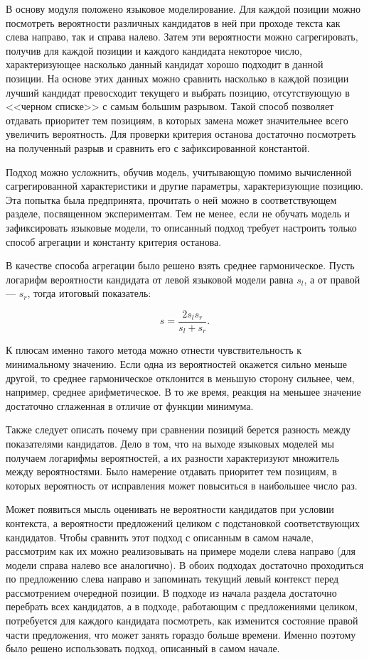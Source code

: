 В основу модуля положено языковое моделирование. Для каждой позиции можно посмотреть вероятности различных кандидатов в ней при проходе текста как слева направо, так и справа налево. Затем эти вероятности можно сагрегировать, получив для каждой позиции и каждого кандидата некоторое число, характеризующее насколько данный кандидат хорошо подходит в данной позиции. На основе этих данных можно сравнить насколько в каждой позиции лучший кандидат превосходит текущего и выбрать позицию, отсутствующую в <<черном списке>> с самым большим разрывом. Такой способ позволяет отдавать приоритет тем позициям, в которых замена может значительнее всего увеличить вероятность. Для проверки критерия останова достаточно посмотреть на полученный разрыв и сравнить его с зафиксированной константой.

Подход можно усложнить, обучив модель, учитывающую помимо вычисленной сагрегированной характеристики и другие параметры, характеризующие позицию. Эта попытка была предпринята, прочитать о ней можно в соответствующем разделе, посвященном экспериментам. Тем не менее, если не обучать модель и зафиксировать языковые модели, то описанный подход требует настроить только способ агрегации и константу критерия останова.

В качестве способа агрегации было решено взять среднее гармоническое. Пусть логарифм вероятности кандидата от левой языковой модели равна $s_l$, а от правой --- $s_r$, тогда итоговый показатель:

\begin{equation*}
	s = \frac{2 s_l s_r}{s_l + s_r}.
\end{equation*} 

К плюсам именно такого метода можно отнести чувствительность к минимальному значению. Если одна из вероятностей окажется сильно меньше другой, то среднее гармоническое отклонится в меньшую сторону сильнее, чем, например, среднее арифметическое. В то же время, реакция на меньшее значение достаточно сглаженная в отличие от функции минимума.

Также следует описать почему при сравнении позиций берется разность между показателями кандидатов. Дело в том, что на выходе языковых моделей мы получаем логарифмы вероятностей, а их разности характеризуют множитель между вероятностями. Было намерение отдавать приоритет тем позициям, в которых вероятность от исправления может повыситься в наибольшее число раз.

Может появиться мысль оценивать не вероятности кандидатов при условии контекста, а вероятности предложений целиком с подстановкой соответствующих кандидатов. Чтобы сравнить этот подход с описанным в самом начале, рассмотрим как их можно реализовывать на примере модели слева направо (для модели справа налево все аналогично). В обоих подходах достаточно проходиться по предложению слева направо и запоминать текущий левый контекст перед рассмотрением очередной позиции. В подходе из начала раздела достаточно перебрать всех кандидатов, а в подходе, работающим с предложениями целиком, потребуется для каждого кандидата посмотреть, как изменится состояние правой части предложения, что может занять гораздо больше времени. Именно поэтому было решено использовать подход, описанный в самом начале.

